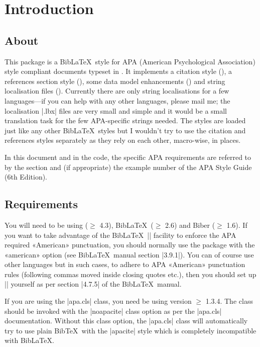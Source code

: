 \documentclass{ltxdockit}
\begin{document}
\section{Introduction}\label{int}

\subsection{About}

This package is a Bib\LaTeX\ style for APA (American Psychological
Association) style compliant documents typeset in \latex. It implements a
citation style (), a references section style
(), some data model enhancements () and string
localisation files (). Currently there are only
string localisations for a few languages---if you can help with any other
languages, please mail me; the localisation |.lbx| files are very small and
simple and it would be a small translation task for the few APA-specific
strings needed. The styles are loaded just like any other Bib\LaTeX\ styles
but I wouldn't try to use the citation and references styles separately as
they rely on each other, macro-wise, in places.

In this document and in the code, the specific APA requirements are
referred to by the section and (if appropriate) the example number of the
APA Style Guide (6th Edition).

\subsection{Requirements}\label{ref:req}

You will need to be using  ($\geq$ 4.3), Bib\LaTeX\ ($\geq$
2.6) and Biber ($\geq$ 1.6). If you want to take advantage of the
Bib\LaTeX\ |\DeclareQuotePunctuation| facility to enforce the APA required
«American» punctuation, you should normally use the  package
with the «american» option (see Bib\LaTeX\ manual section |3.9.1|). You can
of course use other languages but in such cases, to adhere to APA
«American» punctuation rules (following commas moved inside closing quotes
etc.), then you should set up |\DeclareQuotePunctuation| yourself as per
section |4.7.5| of the Bib\LaTeX\ manual.

If you are using the |apa.cls| \latex class, you need be using version
$\geq$ 1.3.4. The class should be invoked with the |noapacite| class option
as per the |apa.cls| documentation. Without this class option, the
|apa.cls| class will automatically try to use plain Bib\TeX\ with the
|apacite| style which is completely incompatible with Bib\LaTeX.
\end{document}
